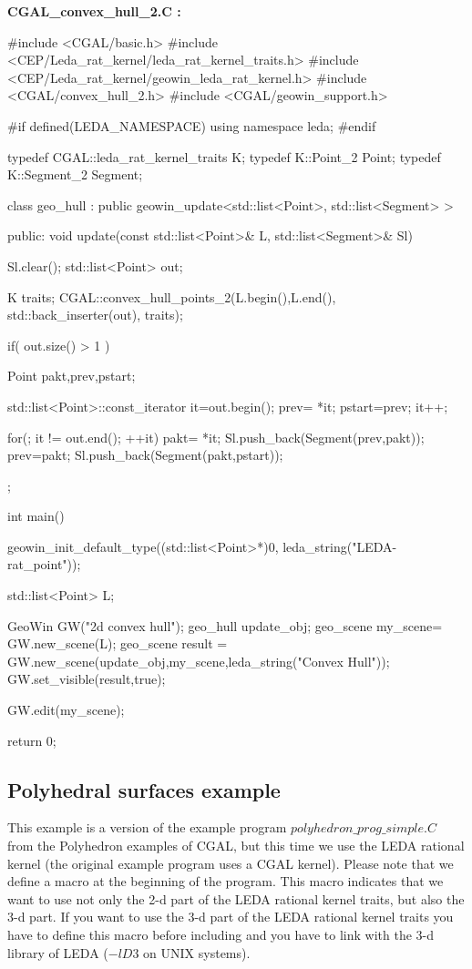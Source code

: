 {\bf CGAL\_convex\_hull\_2.C :}

\begin{ccExampleCode}
#include <CGAL/basic.h>
#include <CEP/Leda_rat_kernel/leda_rat_kernel_traits.h>
#include <CEP/Leda_rat_kernel/geowin_leda_rat_kernel.h>
#include <CGAL/convex_hull_2.h>
#include <CGAL/geowin_support.h>

#if defined(LEDA_NAMESPACE)
using namespace leda;
#endif

typedef CGAL::leda_rat_kernel_traits      K;
typedef K::Point_2                        Point;
typedef K::Segment_2                      Segment;

class geo_hull : public geowin_update<std::list<Point>, std::list<Segment> >
{
public:
 void update(const std::list<Point>& L, std::list<Segment>& Sl)
 {
  Sl.clear();
  std::list<Point> out;
  
  K traits;
  CGAL::convex_hull_points_2(L.begin(),L.end(), std::back_inserter(out), traits);   

  if( out.size() > 1 ) {
    Point pakt,prev,pstart;

    std::list<Point>::const_iterator it=out.begin();
    prev= *it; pstart=prev;
    it++;

    for(; it != out.end(); ++it) {
       pakt= *it;
       Sl.push_back(Segment(prev,pakt));
       prev=pakt;
    }
    Sl.push_back(Segment(pakt,pstart));
  }
 }
 
};

int main()
{
  geowin_init_default_type((std::list<Point>*)0, leda_string("LEDA-rat_point"));
 
  std::list<Point> L;

  GeoWin GW("2d convex hull");
  geo_hull update_obj;
  geo_scene my_scene= GW.new_scene(L);  
  geo_scene result  = GW.new_scene(update_obj,my_scene,leda_string("Convex Hull")); 
  GW.set_visible(result,true);
 
  GW.edit(my_scene);
  
  return 0;  
}
\end{ccExampleCode}

\ccHtmlLinksOn

\subsection{Polyhedral surfaces example}

This example is a version of the example program $polyhedron\_prog\_simple.C$ from the Polyhedron examples
of CGAL, but this time we use the LEDA rational kernel (the original example program uses a CGAL kernel).
Please note that we define a macro  at the beginning of the
program. This macro indicates that we want to use not only the 2-d part of the LEDA rational kernel
traits, but also the 3-d part.
If you want to use the 3-d part of the LEDA rational kernel traits you have to define this macro before
including  and you have to link with the 3-d library of LEDA ($-lD3$ on
UNIX systems).
\ccHtmlLinksOff

